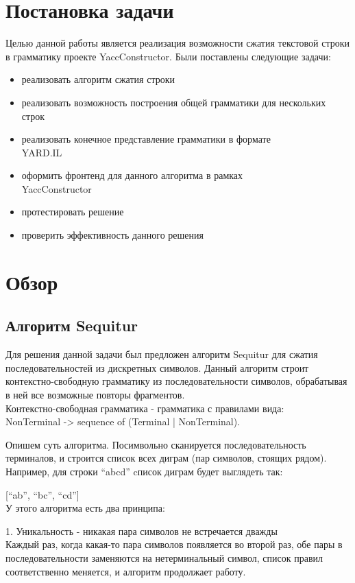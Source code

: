 \documentclass[14pt]{matmex-diploma}
\begin{document}
\section{Постановка задачи}
    Целью данной работы является реализация возможности сжатия текстовой строки в грамматику проекте YaccConstructor. 
    Были поставлены следующие задачи:
    \begin{itemize}
        \item реализовать алгоритм сжатия строки
        \item реализовать возможность построения общей грамматики для нескольких строк  
        \item реализовать конечное представление грамматики в формате \\YARD.IL \cite{YARD}
        \item оформить фронтенд для данного алгоритма в рамках \\YaccConstructor
        \item протестировать решение
        \item проверить эффективность данного решения
    \end{itemize}
    
\section{Обзор}
	\subsection{Алгоритм Sequitur}
	Для решения данной задачи был предложен алгоритм Sequitur \cite{sequitur} для сжатия последовательностей из дискретных символов. Данный алгоритм строит контекстно-свободную грамматику из последовательности символов, обрабатывая в ней все возможные повторы фрагментов. \\ Контекстно-свободная грамматика - грамматика с правилами вида: \\ NonTerminal -> sequence of (Terminal | NonTerminal). 
	
	Опишем суть алгоритма.
	Посимвольно сканируется последовательность терминалов, и строится список всех диграм (пар символов, стоящих рядом).
	Например, для строки “abcd” cписок диграм будет выглядеть так:
	
	[“ab”, “bc”, “cd”]
\\У этого алгоритма есть два принципа:

1. Уникальность - никакая пара символов не встречается дважды \\ Каждый раз, когда какая-то пара символов появляется во второй раз, обе пары в последовательности заменяются на нетерминальный символ, список правил соответственно меняется, и алгоритм продолжает работу. 
\end{document}

